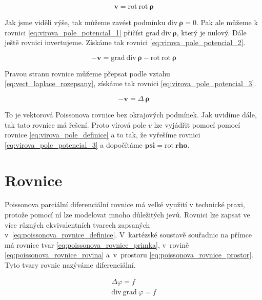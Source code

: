 \documentclass{book}
\newcommand{\vect}[1]{\boldsymbol{#1}}
\newcommand{\grad}{\mathrm{grad}}
\newcommand{\diverg}{\mathrm{div}}
\newcommand{\rot}{\mathrm{rot}}
\begin{document}
\begin{equation}
\label{eq:virova_pole_potencial_1}
\vect{v} = \rot \ \rot \ \vect{\rho}
\end{equation}

Jak jsme viděli výše, tak můžeme zavést podmínku \(\diverg \ \vect{\rho} = 0\). Pak ale můžeme k rovnici \eqref{eq:virova_pole_potencial_1}
přičíst \(\grad \ \diverg \ \vect{\rho}\), který je nulový. Dále ještě rovnici invertujeme. Získáme tak rovnici \eqref{eq:virova_pole_potencial_2}.

\begin{equation}
\label{eq:virova_pole_potencial_2}
-\vect{v} = \grad \ \diverg \ \vect{\rho} - \rot \ \rot \ \vect{\rho}
\end{equation}

Pravou stranu rovnice můžeme přepsat podle vztahu \eqref{eq:vect_laplace_rozepsany}, získáme tak rovnici \eqref{eq:virova_pole_potencial_3}.

\begin{equation}
\label{eq:virova_pole_potencial_3}
-\vect{v} = \Delta \ \vect{\rho}
\end{equation}

To je vektorová Poissonova rovnice bez okrajových podmínek. Jak uvidíme dále, tak tato rovnice má řešení. Proto vírová pole \(v\) lze vyjádřit
pomocí pomocí rovnice \eqref{eq:virova_pole_definice} a to tak, že vyřešíme rovnici \eqref{eq:virova_pole_potencial_3} a dopočítáme \(\vect{psi} = \rot \ \vect{rho}\).


\label{eq:vect_laplace_rozepsany}


\chapter{Rovnice}

Poissonova parciální diferenciální rovnice má velké využití v technické praxi, protože pomocí ní lze modelovat mnoho důležitých jevů.
Rovnici lze zapsat ve více různých ekvivalentních tvarech zapsaných v~\eqref{eq:poissonova_rovnice_definice}. V~kartézské soustavě souřadnic na přímce má rovnice tvar \eqref{eq:poissonova_rovnice_primka}, v~rovině
\eqref{eq:poissonova_rovnice_rovina} a~v~prostoru \eqref{eq:poissonova_rovnice_prostor}. Tyto tvary rovnic nazýváme diferenciální.

\begin{equation}
\label{eq:poissonova_rovnice_definice}
\begin{split}
\Delta \varphi = f \\
\diverg \ \grad \ \varphi = f
\end{split}
\end{equation}
\end{document}
